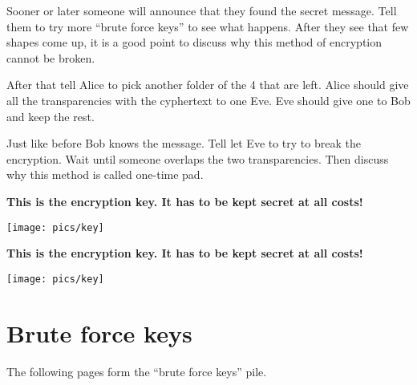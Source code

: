 \documentclass[a4paper,10pt]{article}
\begin{document}
Sooner or later someone will announce that they found the secret message. Tell them to try more ``brute force keys'' to see what happens.
After they see that few shapes come up, it is a good point to discuss why this method of encryption cannot be broken.

After that tell Alice to pick another folder of the 4 that are left. Alice should give all the transparencies with the cyphertext to one Eve. Eve should give one to Bob and keep the rest.

Just like before Bob knows the message. Tell let Eve to try to break the encryption. Wait until someone overlaps the two transparencies. Then discuss why this method is called one-time pad.






\newpage


\thispagestyle{empty}
\begin{center}
\label{pg_key_1}
\Huge\textbf{This is the encryption key. It has to be kept secret at all costs!}

\vspace{5em}

\texttt{[image: pics/key]}
\end{center}

\newpage

\label{pg_key_2}
\thispagestyle{empty}
\begin{center}
\Huge\textbf{This is the encryption key. It has to be kept secret at all costs!}

\vspace{5em}

\texttt{[image: pics/key]}
\end{center}


\newpage

\section{Brute force keys}
\label{ch_BF_keys}

The following pages form the ``brute force keys'' pile.

\newpage
\end{document}

